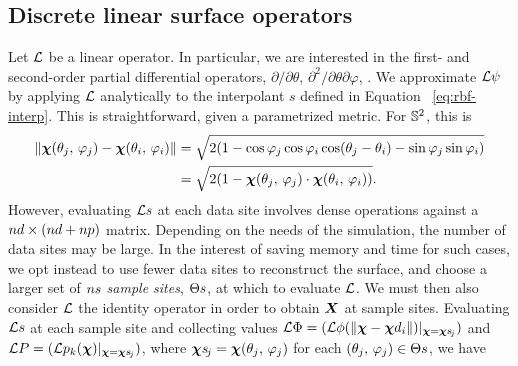 \subsection{Discrete linear surface operators}

Let $\mathcal{L}$ be a linear operator. In particular, we are interested in the first- and
second-order partial differential operators, $\partial/\partial\theta$,
$\partial^2/\partial\theta\partial\varphi$, . We approximate $\mathcal{L}\psi$ by
applying $\mathcal{L}$ analytically to the interpolant $s$ defined in Equation~%
\eqref{eq:rbf-interp}. This is straightforward, given a parametrized metric. For
$\mathbb{S}^2$, this is
\begin{equation}\label{eq:sphere-metric}
    \begin{aligned}
    \|\boldsymbol{\chi}(\theta_j,\,\varphi_j) - \boldsymbol{\chi}(\theta_i,\,\varphi_i)\|
    &= \sqrt{2(1 - \cos\varphi_j\cos\varphi_i\cos(\theta_j-\theta_i) - \sin\varphi_j\sin\varphi_i)} \\
    &= \sqrt{2(1-\boldsymbol{\chi}(\theta_j,\,\varphi_j)\cdot\boldsymbol{\chi}(\theta_i,\,\varphi_i))}.
\end{aligned}
\end{equation}
However, evaluating $\mathcal{L} s$ at each data site involves dense operations against a
$\data\cardinality\times(\data\cardinality+\poly\cardinality)$ matrix. Depending on the
needs of the simulation, the number of data sites may be large.  In the interest of
saving memory and time for such cases, we opt instead to use fewer data sites to
reconstruct the surface, and choose a larger set of $\sample\cardinality$ \emph{sample
sites}, $\sample\sites$, at which to evaluate $\mathcal{L}$. We must then also consider $\mathcal{L}$ the
identity operator in order
to obtain $\boldsymbol{X}$ at sample sites. Evaluating $\mathcal{L} s$ at each sample site
and collecting values $\L\Phi = (\L\phi(\|\Xp-\data\Xp_i\|)|_{\Xp=\Xpsj})$ and
$\L P = (\L p_k(\Xp)|_{\Xp=\Xpsj})$, where $\Xpsj = \Xp(\theta_j,\,\varphi_j)$ for each
$(\theta_j,\,\varphi_j)\in\sample\sites$, we have
